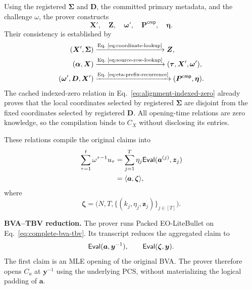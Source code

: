 Using the registered $\bm\Sigma$ and $\bm D$, the committed primary metadata,
and the challenge $\omega$, the prover
constructs
\[
    \bm X',\quad
    \bm Z,\quad
    \bm\omega',\quad
    \bm P^{\mathsf{cmp}},\quad
    \bm\eta.
\]
Their consistency is established by
\begin{equation}
\label{eq:complete-point-compilation}
\begin{aligned}
    (\bm X',\bm\Sigma)
    &\xrightarrow{\text{Eq.~\eqref{eq:coordinate-lookup}}}
        \bm Z,\\
    (\bm\alpha,\bm X)
    &\xrightarrow{\text{Eq.~\eqref{eq:source-row-lookup}}}
        (\bm\tau,\bm X',\bm\omega'),\\
    (\bm\omega',\bm D,\bm X')
    &\xrightarrow{\text{Eq.~\eqref{eq:eta-prefix-recurrence}}}
        (\bm P^{\mathsf{cmp}},\bm\eta).
\end{aligned}
\end{equation}
The cached indexed-zero relation in
Eq.~\eqref{eq:alignment-indexed-zero} already proves that the local
coordinates selected by registered $\bm\Sigma$ are disjoint from the fixed
coordinates selected by registered $\bm D$.  All opening-time relations are
zero knowledge, so the compilation binds to $C_X$ without disclosing its
entries.

These relations compile the original claims into
\begin{equation}
\label{eq:complete-bva-tbv}
\begin{aligned}
    \sum_{\tau=1}^{t}
        \omega^{\tau-1}u_\tau
    &=
    \sum_{j=1}^{T}
        \eta_j
        \mathsf{Eval}(\bm a^{(j)}, \bm z_j)\\
    &=
    \langle\bm a,\bm\zeta\rangle,
\end{aligned}
\end{equation}
where
\[
    \bm\zeta
    =
    \bigl(
        N,T,
        \{(k_j,\eta_j,\bm z_j)\}_{j\in[T]}
    \bigr).
\]

\mysmallskip\noindent
\textbf{BVA--TBV reduction.}
The prover runs Packed EO-LiteBullet on
Eq.~\eqref{eq:complete-bva-tbv}.  Its transcript reduces the aggregated
claim to
\begin{equation}
\label{eq:complete-packed-reduction}
    \mathsf{Eval}(\bm a, \bm y^{-1}),
    \qquad
    \mathsf{Eval}(\bm\zeta, \bm y).
\end{equation}
The first claim is an MLE opening of the original BVA.  The prover therefore
opens $C_a$ at $\bm y^{-1}$ using the underlying PCS, without materializing
the logical padding of $\bm a$.


